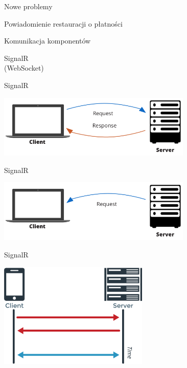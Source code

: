 \documentclass{beamer}
\begin{document}
\begin{frame}{Nowe problemy}
	\begin{center}
		\Huge{Powiadomienie restauracji o płatności}
	\end{center}
\end{frame}

\begin{frame}{Komunikacja komponentów}
	\begin{center}
		\Huge{SignalR}\\
		\huge{(WebSocket)}
	\end{center}
\end{frame}

\begin{frame}{SignalR}
	\begin{center}
		\includegraphics[height=3cm]{prosta_komunikacja2.png}
	\end{center}
\end{frame}

\begin{frame}{SignalR}
	\begin{center}
		\includegraphics[height=3cm]{signalr1.png}
	\end{center}
\end{frame}

\begin{frame}{SignalR}
	\begin{center}
		\includegraphics[height=5cm]{websocket1.png}
	\end{center}
\end{frame}
\end{document}
